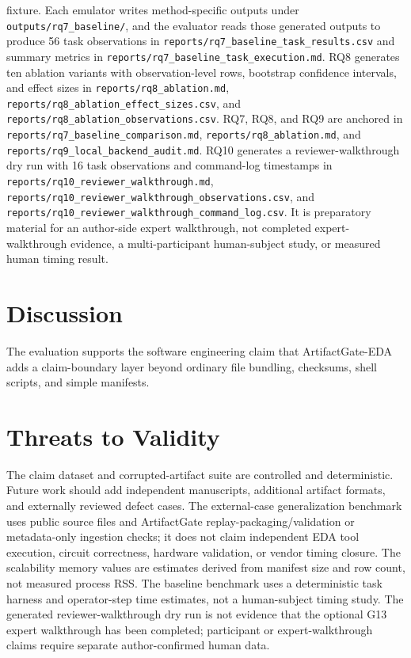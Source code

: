 \documentclass[preprint,12pt]{elsarticle}
\begin{document}
fixture. Each emulator writes method-specific outputs under
\texttt{outputs/rq7\_baseline/}, and the evaluator reads those generated outputs
to produce 56 task observations in
\texttt{reports/rq7\_baseline\_task\_results.csv} and summary metrics in
\texttt{reports/rq7\_baseline\_task\_execution.md}. RQ8 generates ten
ablation variants with observation-level rows, bootstrap confidence intervals,
and effect sizes in \texttt{reports/rq8\_ablation.md},
\texttt{reports/rq8\_ablation\_effect\_sizes.csv}, and
\texttt{reports/rq8\_ablation\_observations.csv}. RQ7, RQ8, and RQ9 are
anchored in \texttt{reports/rq7\_baseline\_comparison.md},
\texttt{reports/rq8\_ablation.md}, and
\texttt{reports/rq9\_local\_backend\_audit.md}. RQ10 generates a
reviewer-walkthrough dry run with 16 task observations and command-log
timestamps in \texttt{reports/rq10\_reviewer\_walkthrough.md},
\texttt{reports/rq10\_reviewer\_walkthrough\_observations.csv}, and
\texttt{reports/rq10\_reviewer\_walkthrough\_command\_log.csv}. It is
preparatory material for an author-side expert walkthrough, not completed
expert-walkthrough evidence, a multi-participant human-subject study, or
measured human timing result.

\section{Discussion}

The evaluation supports the software engineering claim that ArtifactGate-EDA
adds a claim-boundary layer beyond ordinary file bundling, checksums, shell
scripts, and simple manifests.

\section{Threats to Validity}

The claim dataset and corrupted-artifact suite are controlled and deterministic.
Future work should add independent manuscripts, additional artifact formats, and
externally reviewed defect cases. The external-case generalization benchmark
uses public source files and ArtifactGate replay-packaging/validation or
metadata-only ingestion checks; it does not claim independent EDA tool
execution, circuit correctness, hardware validation, or vendor timing closure.
The scalability memory values are estimates derived from manifest size and row
count, not measured process RSS. The baseline benchmark uses a deterministic
task harness and operator-step time estimates, not a human-subject timing
study. The generated reviewer-walkthrough dry run is not evidence that the
optional G13 expert walkthrough has been completed; participant or
expert-walkthrough claims require separate author-confirmed human data.
\end{document}
